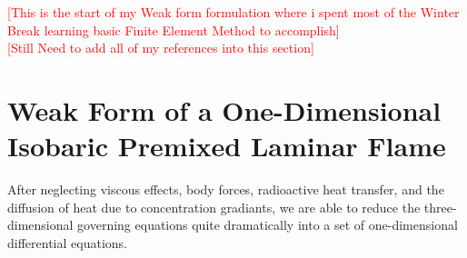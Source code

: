 \documentclass{article}
\newcommand{\red}[1]{\textcolor{red}{[#1]}} %
\begin{document}
\vspace{5mm}
\red{This is the start of my Weak form formulation where i spent most of the Winter Break learning basic Finite Element Method to accomplish}\\
\vspace{5mm}
\red{Still Need to add all of my references into this section}\\
\newpage
\section{Weak Form of a One-Dimensional Isobaric Premixed Laminar Flame}

After neglecting viscous effects, body forces, radioactive heat transfer, and the diffusion of heat due to concentration gradiants, we are able to reduce the three-dimensional governing equations quite dramatically into a set of one-dimensional differential equations.
\end{document}
